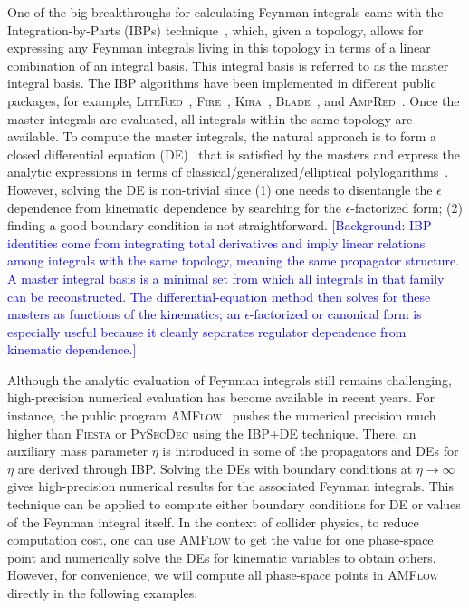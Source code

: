 \documentclass[a4paper,11pt]{article}
\begin{document}
One of the big breakthroughs for calculating Feynman integrals came with the Integration-by-Parts (IBPs) technique~\cite{Tkachov:1981wb,Chetyrkin:1981qh}, which, given a topology, allows for expressing any Feynman integrals living in this topology in terms of a linear combination of an integral basis. This integral basis is referred to as the master integral basis. The IBP algorithms have been implemented in different public packages, for example, \textsc{LiteRed}~\cite{Lee:2012cn,Lee:2013mka}, \textsc{Fire}~\cite{Smirnov:2008iw,Smirnov:2014hma,Smirnov:2019qkx, Smirnov:2023yhb}, \textsc{Kira}~\cite{Maierhofer:2017gsa,Klappert:2020nbg,Lange:2025fba}, \textsc{Blade}~\cite{Liu:2018dmc, Guan:2019bcx, Guan:2024byi}, and \textsc{AmpRed}~\cite{Chen:2024xwt}. Once the master integrals are evaluated, all integrals within the same topology are available. To compute the master integrals, the natural approach is to form a closed differential equation (DE)~\cite{Kotikov:1990kg,Kotikov:1991pm,Bern:1993kr,Remiddi:1997ny, Henn:2013pwa} that is satisfied by the masters and express the analytic expressions in terms of classical/generalized/elliptical polylogarithms~\cite{Goncharov:1998kja, Goncharov:2001iea, Goncharov:2010jf, Duhr:2011zq, Duhr:2012fh}. However, solving the DE is non-trivial since (1) one needs to disentangle the $\epsilon$ dependence from kinematic dependence by searching for the $\epsilon$-factorized form; (2) finding a good boundary condition is not straightforward. 
\textcolor{blue}{\small [Background: IBP identities come from integrating total derivatives and imply linear relations among integrals with the same topology, meaning the same propagator structure. A master integral basis is a minimal set from which all integrals in that family can be reconstructed. The differential-equation method then solves for these masters as functions of the kinematics; an $\epsilon$-factorized or canonical form is especially useful because it cleanly separates regulator dependence from kinematic dependence.]}


Although the analytic evaluation of Feynman integrals still remains challenging, high-precision numerical evaluation has become available in recent years.
For instance, the public program \textsc{AMFlow}~\cite{Liu:2017jxz, Liu:2018dmc, Liu:2021wks,Liu:2022chg, Liu:2022mfb} pushes the numerical precision much higher than \textsc{Fiesta} or \textsc{PySecDec} using the IBP+DE technique. There, an auxiliary mass parameter $\eta$ is introduced in some of the propagators and DEs for $\eta$ are derived through IBP. Solving the DEs with boundary conditions at $\eta\to\infty$ gives high-precision numerical results for the associated Feynman integrals. This technique can be applied to compute either boundary conditions for DE or values of the Feynman integral itself. In the context of collider physics, to reduce computation cost, one can use \textsc{AMFlow} to get the value for one phase-space point and numerically solve the DEs for kinematic variables to obtain others. However, for convenience, we will compute all phase-space points in \textsc{AMFlow} directly in the following examples.
\end{document}
